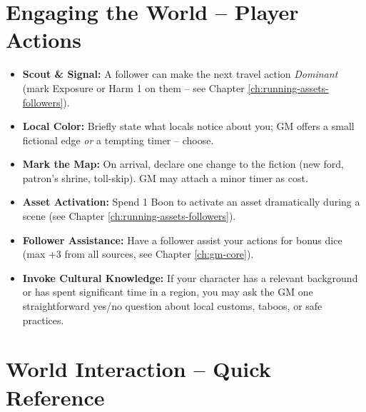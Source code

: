 \section{Engaging the World -- Player Actions}
\label{sec:player-actions-world}
\begin{itemize}
\item \textbf{Scout \& Signal:} A follower can make the next travel action \emph{Dominant} (mark Exposure or Harm 1 on them -- see Chapter \ref{ch:running-assets-followers}).
\item \textbf{Local Color:} Briefly state what locals notice about you; GM offers a small fictional edge \emph{or} a tempting timer -- choose.
\item \textbf{Mark the Map:} On arrival, declare one change to the fiction (new ford, patron's shrine, toll-skip). GM may attach a minor timer as cost.
\item \textbf{Asset Activation:} Spend 1 Boon to activate an asset dramatically during a scene (see Chapter \ref{ch:running-assets-followers}).
\item \textbf{Follower Assistance:} Have a follower assist your actions for bonus dice (max +3 from all sources, see Chapter \ref{ch:gm-core}).
\item \textbf{Invoke Cultural Knowledge:} If your character has a relevant background or has spent significant time in a region, you may ask the GM one straightforward yes/no question about local customs, taboos, or safe practices.
\end{itemize}

\section{World Interaction -- Quick Reference}
\label{sec:world-interaction-quickref}

